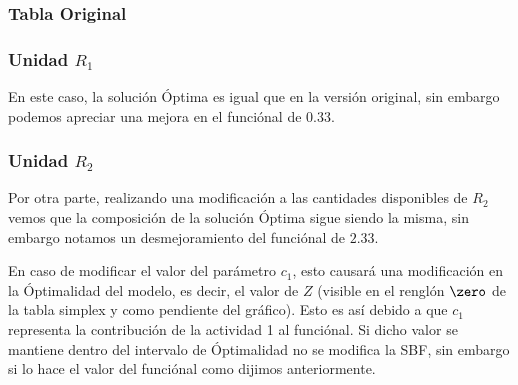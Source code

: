 

\begin{homeworkProblem}[-1][Modelo \RN{1}]
\subsubsection{Tabla Original}
\subsubsection{Unidad $R_1$}
En este caso, la solución Óptima es igual que en la versión original, sin embargo podemos apreciar una mejora en el funciónal de $0.33$.
\subsubsection{Unidad $R_2$}
Por otra parte, realizando una modificación a las cantidades disponibles de $R_2$ vemos que la composición de la solución Óptima sigue siendo la misma, sin embargo notamos un desmejoramiento del funciónal de $2.33$. 
\end{homeworkProblem}

\begin{homeworkProblem}[-1][Modelo \RN{2}]
En caso de modificar el valor del parámetro $c_1$, esto causará una modificación en la Óptimalidad del modelo, es decir, el valor de $Z$ (visible en el renglón $\zero$ de la tabla simplex y como pendiente del gráfico).
Esto es así debido a que $c_1$ representa la contribución de la actividad 1 al funciónal. Si dicho valor se mantiene dentro del intervalo de Óptimalidad no se modifica la SBF, sin embargo si lo hace el valor del funciónal como dijimos anteriormente.
\end{homeworkProblem}

